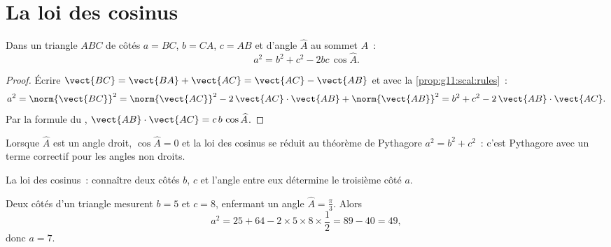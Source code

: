 \section{La loi des cosinus}

\begin{theorem}\label{thm:g11:scal:cosines}
Dans un triangle $ABC$ de côtés $a = BC$, $b = CA$, $c = AB$ et d'angle
$\widehat A$ au sommet $A$~:
\[
a^2 = b^2 + c^2 - 2bc\,\cos\widehat A .
\]
\end{theorem}

\begin{proof}
Écrire $\vect{BC} = \vect{BA} + \vect{AC} = \vect{AC} - \vect{AB}$ et
 avec la \cref{prop:g11:scal:rules}~:
\[
a^2 = \norm{\vect{BC}}^2
= \norm{\vect{AC}}^2 - 2\,\vect{AC}\cdot\vect{AB} + \norm{\vect{AB}}^2
= b^2 + c^2 - 2\,\vect{AB}\cdot\vect{AC}.
\]
Par la formule du ,
$\vect{AB}\cdot\vect{AC} = c\,b\,\cos\widehat A$.
\end{proof}

\begin{remark}
Lorsque $\widehat A$ est un angle droit, $\cos\widehat A = 0$ et la loi
des cosinus se réduit au théorème de Pythagore $a^2 = b^2 + c^2$~:
c'est Pythagore avec un terme correctif pour les angles non droits.
\end{remark}

\begin{omfigure}

{\small La loi des cosinus~: connaître deux côtés $b$, $c$ et l'angle
entre eux détermine le troisième côté $a$.}
\end{omfigure}

\begin{example}\label{ex:g11:scal:cosines}
Deux côtés d'un triangle mesurent $b = 5$ et $c = 8$, enfermant un angle
$\widehat A = \frac\pi3$. Alors
\[
a^2 = 25 + 64 - 2 \times 5 \times 8 \times \frac12 = 89 - 40 = 49,
\]
donc $a = 7$.
\end{example}

